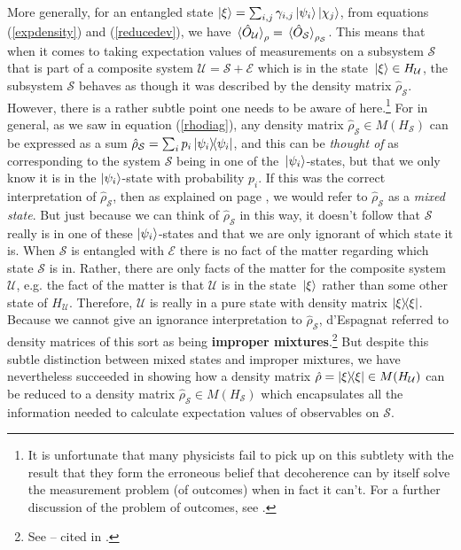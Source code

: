     More generally, \label{subtle}for an entangled state $\ket{\xi}=\sum_{i,j}\gamma_{i,j}\ket{\psi_i}\ket{\chi_j}$, from equations (\ref{expdensity}) and (\ref{reducedev}), we have  $\ev*{\hat{O}_\mathcal{U}}_\rho=\ev*{\hat{O}_\mathcal{S}}_{\rho_\mathcal{S}}$. This means that when it comes to taking expectation values of measurements on a subsystem $\mathcal{S}$ that is part of a composite system $\mathcal{U}=\mathcal{S}+\mathcal{E}$ which is in the state $\ket*{\xi}\in H_\mathcal{U}$, the subsystem $\mathcal{S}$ behaves as though it was described by the density matrix $\hat{\rho}_\mathcal{S}$. However, there is a rather subtle point one needs to be aware of here.\footnote{It is unfortunate that many physicists fail to pick up on this subtlety with the result that they form the erroneous belief that decoherence can by itself solve the measurement problem (of outcomes) when in fact it can't. For a further discussion of the problem of outcomes, see \cite[57-60]{Schlosshauer}.} 
    For in general, as we saw in equation (\ref{rhodiag}),  any density matrix $\hat{\rho}_\mathcal{S}\in M(H_\mathcal{S})$ can be expressed as a sum $\hat{\rho}_\mathcal{S}=\sum_i p_i\dyad{\psi_i}$, and this can be \emph{thought of} as corresponding to the system $\mathcal{S}$ being in one of the $\ket*{\psi_i}$-states, but that we only know it is in the $\ket{\psi_i}$-state with probability $p_i$. If this was the correct interpretation of  $\hat{\rho}_\mathcal{S}$, then as explained on page \pageref{mixedstate}, we would refer to  $\hat{\rho}_\mathcal{S}$ as a \emph{mixed state}. But just because we can think of $\hat{\rho}_\mathcal{S}$ in this way, it doesn't follow that $\mathcal{S}$ really is in one of these $\ket{\psi_i}$-states and that we are only ignorant of which state it is. When $\mathcal{S}$ is entangled with $\mathcal{E}$ there is no fact of the matter regarding which state $\mathcal{S}$ is in. Rather, there are only facts of the matter for the composite system $\mathcal{U}$, e.g. the fact of the matter is that $\mathcal{U}$ is in the state $\ket*{\xi}$ rather than some other state of $H_\mathcal{U}$. Therefore, $\mathcal{U}$ is really in a pure state with density matrix $\dyad{\xi}$. Because we cannot give an ignorance interpretation to  $\hat{\rho}_\mathcal{S}$, d’Espagnat\label{Espagnat} referred to density matrices of this sort as being \textbf{improper mixtures}.\footnote{See \cite[ch. 6.2]{Espagnat} -- cited in \cite[p. 19]{Butterfield}.} But despite this subtle distinction between mixed states and improper mixtures, we have nevertheless succeeded in showing how a density matrix $\hat{\rho}=\dyad{\xi}\in M(H_\mathcal{U})$ can be reduced to a density matrix $\hat{\rho}_\mathcal{S}\in M(H_\mathcal{S})$ which encapsulates all the information needed to calculate expectation values of observables on $\mathcal{S}$.\label{subtleend} 
    
